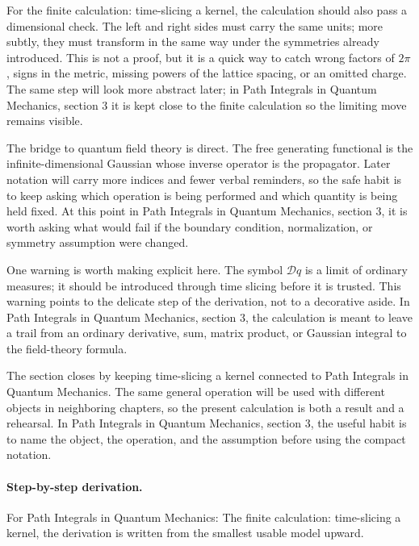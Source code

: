 For the finite calculation: time-slicing a kernel, the calculation should also pass a dimensional check.  The left and right sides must carry the same units; more subtly, they must transform in the same way under the symmetries already introduced.  This is not a proof, but it is a quick way to catch wrong factors of \(2\pi\), signs in the metric, missing powers of the lattice spacing, or an omitted charge.  The same step will look more abstract later; in Path Integrals in Quantum Mechanics, section 3 it is kept close to the finite calculation so the limiting move remains visible.

The bridge to quantum field theory is direct.  The free generating functional is the infinite-dimensional Gaussian whose inverse operator is the propagator.  Later notation will carry more indices and fewer verbal reminders, so the safe habit is to keep asking which operation is being performed and which quantity is being held fixed.  At this point in Path Integrals in Quantum Mechanics, section 3, it is worth asking what would fail if the boundary condition, normalization, or symmetry assumption were changed.

One warning is worth making explicit here.  The symbol \(\mathcal D q\) is a limit of ordinary measures; it should be introduced through time slicing before it is trusted.  This warning points to the delicate step of the derivation, not to a decorative aside.  In Path Integrals in Quantum Mechanics, section 3, the calculation is meant to leave a trail from an ordinary derivative, sum, matrix product, or Gaussian integral to the field-theory formula.

The section closes by keeping time-slicing a kernel connected to Path Integrals in Quantum Mechanics.  The same general operation will be used with different objects in neighboring chapters, so the present calculation is both a result and a rehearsal.  In Path Integrals in Quantum Mechanics, section 3, the useful habit is to name the object, the operation, and the assumption before using the compact notation.



\paragraph{Step-by-step derivation.}

For Path Integrals in Quantum Mechanics: The finite calculation: time-slicing a kernel, the derivation is written from the smallest usable model upward.

